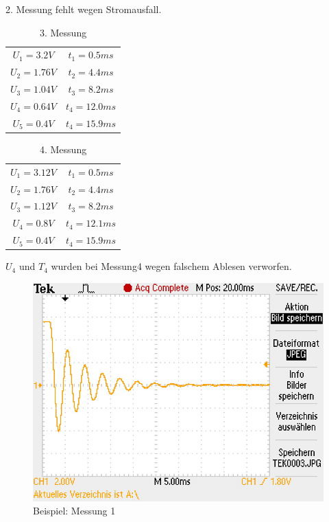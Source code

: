 \documentclass[12pt,a4paper]{article}
\begin{document}
2. Messung fehlt wegen Stromausfall.

\begin{table}[H]\centering
\caption{3. Messung}
\begin{tabular}{c|c}
\hline
$U_1=3.2V$& $t_1=0.5ms$\\ 
$U_2=1.76V$& $t_2=4.4ms$\\ 
$U_3=1.04V$& $t_3=8.2ms$ \\
$U_4=0.64V$& $t_4=12.0ms$ \\
$U_5=0.4V$& $t_4=15.9ms$ \\
\end{tabular} 
\end{table}

\begin{table}[H]\centering
\caption{4. Messung}
\begin{tabular}{c|c}
\hline
$U_1=3.12V$& $t_1=0.5ms$\\ 
$U_2=1.76V$& $t_2=4.4ms$\\ 
$U_3=1.12V$& $t_3=8.2ms$ \\
$U_4=0.8V$& $t_4=12.1ms$ \\
$U_5=0.4V$& $t_4=15.9ms$ \\
\end{tabular} 
\end{table}

$U_4$ und $T_4$ wurden bei Messung4 wegen falschem Ablesen verworfen.

\begin{figure}[H]\centering
\includegraphics[scale=0.7]{TEK0003.JPG}
\caption{Beispiel: Messung 1}
\end{figure}
\end{document}
